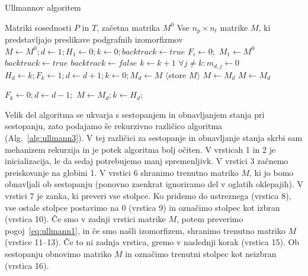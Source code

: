 \documentclass[a4paper, 12pt, ]{book}
\newcommand{\refalg}[1]{(Alg.~\ref{#1})}
\begin{document}
\begin{algorithm}
\caption{Ullmannov algoritem}
\label{alg:ullmann1}
\begin{algorithmic}[1]
	\Require Matriki sosednosti $P$ in $T$, začetna matrika $M^0$
	\Ensure Vse $n_p \times n_t$ matrike $M$, ki predstavljajo preslikave podgrafnih izomorfizmov				
	\State $M \gets M^0; d \gets 1; H_1 \gets 0; k \gets 0; backtrack \gets true$								
	 $F_i \gets 0;$ \EndFor													
	\State $M_1 \gets M^0$																	
		\State $backtrack \gets true$													
			\State $backtrack \gets false$
			\Repeat 
				\State $k \gets k +1$ 															
			\State $\forall j \not = k : m_{d,j} \gets 0$										\label{alg:ullmann1.11}
					\State $H_d \gets k; F_k \gets 1; d \gets d+1; k \gets 0; M_d \gets M$
				\Else																			
						\State $\langle$store $M$$\rangle$
					\EndIf													
						\State $M \gets M_d$		
				\EndIf
			\Else
				\State $M \gets M_d$
			\EndIf
		\EndIf
		
			\State $F_k \gets 0; d \gets d-1;$													
				\State $M \gets M_d; k \gets H_d;$												
			\EndIf
		\EndIf
	\EndWhile
\end{algorithmic}
\end{algorithm}

	Velik del algoritma se ukvarja s sestopanjem in obnavljanjem stanja pri sestopanju, zato podajamo še rekurzivno različico algoritma 
	\refalg{alg:ullmann3}. V tej različici za sestopanje in obnavljanje stanja skrbi sam mehanizem rekurzija in je potek algoritma bolj očiten. V vrsticah 1 in 2 
	je inicializacija, le da sedaj potrebujemo manj spremenljivk. V vrstici 3 začnemo preiskovanje na globini 1. V vrstici 6 shranimo trenutno matriko $M$,
	ki jo bomo obnavljali ob sestopanju (ponovno zaenkrat ignoriramo del v oglatih oklepajih). V vrstici 7 je zanka, ki preveri vse stolpce. Ko pridemo do
	ustreznega (vrstica 8), vse ostale stolpce postavimo na 0 (vrstica 9) in označimo stolpec kot izbran (vrstica 10). Če smo v zadnji vrstici matrike $M$,
	potem preverimo pogoj~\ref{eq:ullmann1}, in če smo našli izomorfizem, shranimo trenutno matriko $M$ (vrstice 11--13). Če to ni zadnja vrstica, gremo
	v naslednji korak (vrstica 15). Ob sestopanju obnovimo matriko $M$ in označimo trenutni stolpec kot neizbran (vrstica 16).
\end{document}
